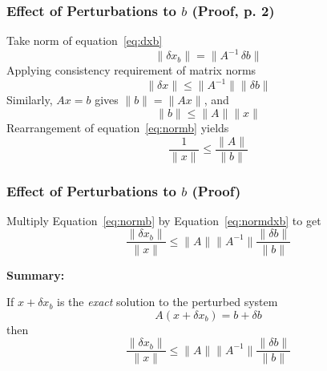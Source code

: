 \documentclass[10pt]{beamer}
\newcommand{\norm}[1]{{\ensuremath{{\|#1\|}}}}
\begin{document}
\begin{frame}
\frametitle{Effect of Perturbations to $b$ (Proof, p. 2)}

Take norm of equation~\eqref{eq:dxb}
\begin{equation*}
    \norm{\delta x_b} = \norm{A^{-1}\,\delta b}
\end{equation*}
Applying consistency requirement of matrix norms
\begin{equation}   \label{eq:normdxb}
    \norm{\delta x} \le \norm{A^{-1}}\norm{\delta b}
\end{equation}
Similarly, $Ax=b$ gives $\norm{b} = \norm{Ax}$, and
\begin{equation}   \label{eq:normb}
    \norm{b} \le \norm{A}\norm{x}
\end{equation}
Rearrangement of equation~\eqref{eq:normb} yields
\begin{equation}     \label{eq:normxi}
    \frac{1}{\norm{x}} \le \frac{\norm{A}}{\norm{b}}
\end{equation}

\end{frame}
\begin{frame}
\frametitle{Effect of Perturbations to $b$ (Proof)}


Multiply Equation~\eqref{eq:normb} by Equation~\eqref{eq:normdxb} to get
\begin{equation}    \label{eq:dxbonx}
    \frac{\norm{\delta x_b}}{\norm{x}} \le \norm{A}\norm{A^{-1}} \frac{\norm{\delta b}}{{\norm{b}}}
\end{equation}

\begin{center}
\begin{minipage}{0.75\textwidth}
\textbf{Summary:}\par\vspace{1ex}
If $x + \delta x_b$ is the \emph{exact} solution to the perturbed system
\begin{equation*}
    A (x + \delta x_b) = b + \delta b
\end{equation*}
then
\begin{equation*}
    \frac{\norm{\delta x_b}}{\norm{x}} \le \norm{A}\norm{A^{-1}} \frac{\norm{\delta b}}{{\norm{b}}}
\end{equation*}
\end{minipage}
\end{center}

\end{frame}
\end{document}
